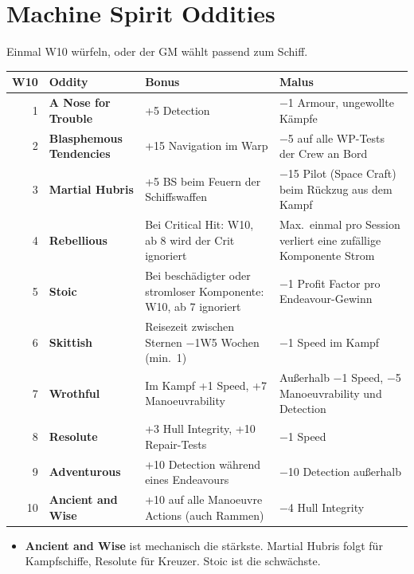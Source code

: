 \documentclass[9pt,a4paper]{extarticle}
\newcommand{\plus}[1]{\textcolor{good}{#1}}
\newcommand{\minus}[1]{\textcolor{bad}{#1}}
\newcommand{\nm}[1]{\textbf{#1}}
\newcommand{\src}[1]{\hfill\raisebox{3pt}{\monofont\footnotesize\color{ink3}#1}}
\newenvironment{urteil}{\begin{tcolorbox}[colback=brasssoft,colframe=brass,boxrule=0pt,leftrule=2pt,arc=0pt,left=6pt,right=6pt,top=4pt,bottom=4pt,before skip=6pt,after skip=10pt,title={\monofont\scriptsize\bfseries\color{brass}URTEIL},coltitle=brass,colbacktitle=brasssoft,toptitle=2pt,bottomtitle=0pt,attach title to upper=\par]\begin{itemize}[leftmargin=10pt,itemsep=1pt,parsep=0pt,topsep=2pt]}{\end{itemize}\end{tcolorbox}}
\begin{document}
\section{Machine Spirit Oddities \src{S. 197, Tabelle 8-1}}
Einmal W10 würfeln, oder der GM wählt passend zum Schiff.

\begin{xltabular}{\linewidth}{N l Y Y}
\toprule
{}\textbf{W10} & \textbf{Oddity} & \textbf{Bonus} & \textbf{Malus}\\
\midrule
{} & \nm{A Nose for Trouble} & \plus{+5 Detection} & \minus{−1 Armour}, ungewollte Kämpfe\\
2 & \nm{Blasphemous Tendencies} & \plus{+15 Navigation} im Warp & \minus{−5 auf alle WP-Tests} der Crew an Bord\\
3 & \nm{Martial Hubris} & \plus{+5 BS} beim Feuern der Schiffswaffen & \minus{−15 Pilot (Space Craft)} beim Rückzug aus dem Kampf\\
4 & \nm{Rebellious} & Bei Critical Hit: W10, ab 8 wird der Crit ignoriert & Max.\ einmal pro Session verliert eine zufällige Komponente Strom\\
5 & \nm{Stoic} & Bei beschädigter oder stromloser Komponente: W10, ab 7 ignoriert & \minus{−1 Profit Factor} pro Endeavour-Gewinn\\
6 & \nm{Skittish} & Reisezeit zwischen Sternen \plus{−1W5 Wochen} (min.\ 1) & \minus{−1 Speed} im Kampf\\
7 & \nm{Wrothful} & Im Kampf \plus{+1 Speed, +7 Manoeuvrability} & Außerhalb \minus{−1 Speed, −5 Manoeuvrability und Detection}\\
8 & \nm{Resolute} & \plus{+3 Hull Integrity}, \plus{+10 Repair-Tests} & \minus{−1 Speed}\\
9 & \nm{Adventurous} & \plus{+10 Detection} während eines Endeavours & \minus{−10 Detection} außerhalb\\
10 & \nm{Ancient and Wise} & \plus{+10 auf alle Manoeuvre Actions} (auch Rammen) & \minus{−4 Hull Integrity}\\
\bottomrule
\end{xltabular}

\begin{urteil}
\item \nm{Ancient and Wise} ist mechanisch die stärkste. Martial Hubris folgt für Kampfschiffe, Resolute für Kreuzer. Stoic ist die schwächste.
\end{urteil}

\end{document}
